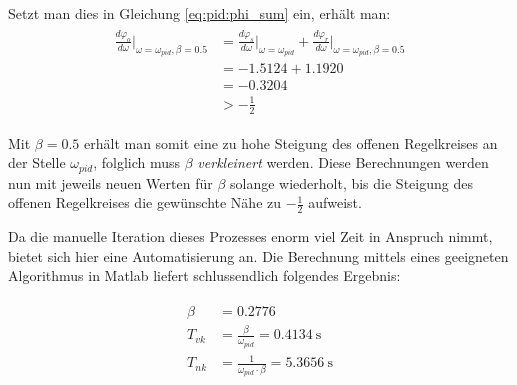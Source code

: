 Setzt man dies in Gleichung \ref{eq:pid:phi_sum} ein, erh\"alt man:
\begin{gather} \label{eq:pid:phi_sum_result_iteration_one}
    \begin{split}
    \frac{d\varphi_o}{d\omega}       \biggr \rvert_{\omega=\omega_{pid}, \beta=0.5}
        & = \frac{d\varphi_s}{d\omega} \biggr \rvert_{\omega=\omega_{pid}}
        + \frac{d\varphi_r}{d\omega} \biggr \rvert_{\omega=\omega_{pid}, \beta=0.5} \\
        & = -1.5124 + 1.1920 \\
        & = -0.3204 \\
        & > -\frac{1}{2}
    \end{split}
\end{gather}

Mit  $\beta   =  0.5$   erh\"alt  man   somit  eine   zu  hohe   Steigung  des
offenen  Regelkreises  an der  Stelle  $\omega_{pid}$,  folglich muss  $\beta$
\emph{verkleinert} werden.   Diese Berechnungen  werden nun mit  jeweils neuen
Werten  f\"ur  $\beta$  solange  wiederholt,  bis  die  Steigung  des  offenen
Regelkreises die gew\"unschte N\"ahe zu $-\frac{1}{2}$ aufweist.

Da die manuelle Iteration dieses Prozesses  enorm viel Zeit in Anspruch nimmt,
bietet  sich  hier  eine  Automatisierung  an. Die  Berechnung  mittels  eines
geeigneten Algorithmus in Matlab liefert schlussendlich folgendes Ergebnis:

\begin{gather} \label{eq:pid:beta_result}
    \begin{split}
        \beta    & = 0.2776 \\
        {T_{vk}} & = \frac{\beta}{\omega_{pid}}           = \SI{0.4134}{\second} \\
        {T_{nk}} & = \frac{1}{\omega_{pid} \cdot \beta}   = \SI{5.3656}{\second} \\
    \end{split}
\end{gather}

